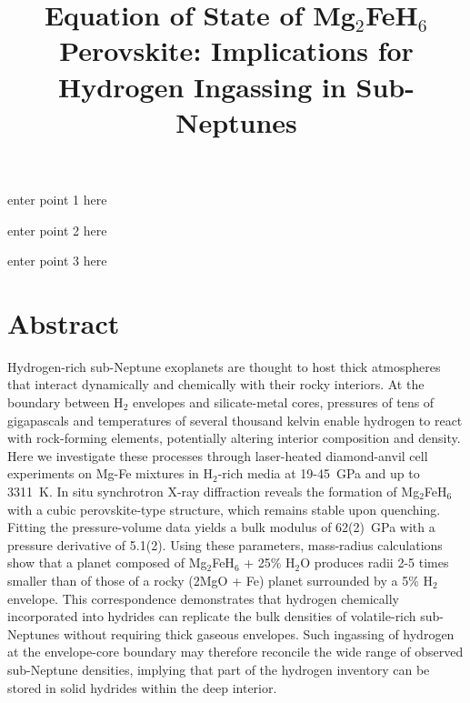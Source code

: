 \documentclass[draft,jgrga,12pt]{agujournal2019}
\begin{document}
\title{Equation of State of Mg$_2$FeH$_6$ Perovskite: Implications for Hydrogen Ingassing in Sub-Neptunes}





\begin{keypoints}
\item enter point 1 here
\item enter point 2 here
\item enter point 3 here
\end{keypoints}


\section*{Abstract}

Hydrogen-rich sub-Neptune exoplanets are thought to host thick atmospheres that interact dynamically and chemically with their rocky interiors. At the boundary between H$_2$ envelopes and silicate-metal cores, pressures of tens of gigapascals and temperatures of several thousand kelvin enable hydrogen to react with rock-forming elements, potentially altering interior composition and density. Here we investigate these processes through laser-heated diamond-anvil cell experiments on Mg-Fe mixtures in H$_2$-rich media at 19-45~{GPa} and up to 3311~K. In situ synchrotron X-ray diffraction reveals the formation of Mg$_2$FeH$_6$ with a cubic perovskite-type structure, which remains stable upon quenching. Fitting the pressure-volume data yields a bulk modulus of 62(2)~{GPa} with a pressure derivative of 5.1(2). Using these parameters, mass-radius calculations show that a planet composed of Mg$_2$FeH$_6$ + 25\% H$_2$O produces radii 2-5 times smaller than of those of a rocky (2MgO + Fe) planet surrounded by a 5\% H$_2$ envelope. This correspondence demonstrates that hydrogen chemically incorporated into hydrides can replicate the bulk densities of volatile-rich sub-Neptunes without requiring thick gaseous envelopes. Such ingassing of hydrogen at the envelope-core boundary may therefore reconcile the wide range of observed sub-Neptune densities, implying that part of the hydrogen inventory can be stored in solid hydrides within the deep interior.
\end{document}
